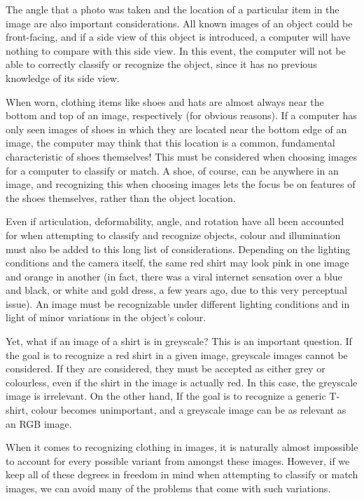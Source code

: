 \documentclass[12pt]{report} %
\begin{document}
	The angle that a photo was taken and the location of a particular item in the image are also important considerations. All known images of an object could be front-facing, and if a side view of this object is introduced, a computer will have nothing to compare with this side view. In this event, the computer will not be able to correctly classify or recognize the object, since it has no previous knowledge of its side view. 

	When worn, clothing items like shoes and hats are almost always near the bottom and top of an image, respectively (for obvious reasons). If a computer has only seen images of shoes in which they are located near the bottom edge of an image, the computer may think that this location is a common, fundamental characteristic of shoes themselves! This must be considered when choosing images for a computer to classify or match. A shoe, of course, can be anywhere in an image, and recognizing this when choosing images lets the focus be on features of the shoes themselves, rather than the object location. 
	
	Even if articulation, deformability, angle, and rotation have all been accounted for when attempting to classify and recognize objects, colour and illumination must also be added to this long list of considerations. Depending on the lighting conditions and the camera itself, the same red shirt may look pink in one image and orange in another (in fact, there was a viral internet sensation over a blue and black, or white and gold dress, a few years ago, due to this very perceptual issue). An image must be recognizable under different lighting conditions and in light of minor variations in the object's colour. 

	Yet, what if an image of a shirt is in greyscale? This is an important question. If the goal is to recognize a red shirt in a given image, greyscale images cannot be considered. If they are considered, they must be accepted as either grey or colourless, even if the shirt in the image is actually red. In this case, the greyscale image is irrelevant. On the other hand, If the goal is to recognize a generic T-shirt, colour becomes unimportant, and a greyscale image can be as relevant as an RGB image.
	
	When it comes to recognizing clothing in images, it is naturally almost impossible to account for every possible variant from amongst these images. However, if we keep all of these degrees in freedom in mind when attempting to classify or match images, we can avoid many of the problems that come with such variations. 
		
\end{document}
